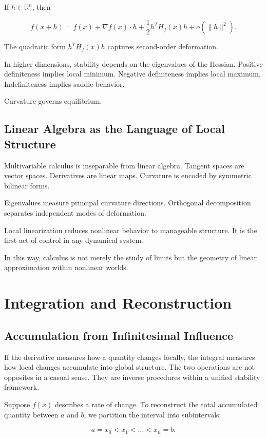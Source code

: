 \documentclass[12pt]{book}
\begin{document}
If $h \in \mathbb{R}^n$, then

\[
f(x + h) = f(x) + \nabla f(x) \cdot h + \frac{1}{2} h^T H_f(x) h + o(\|h\|^2).
\]

The quadratic form $h^T H_f(x) h$ captures second-order deformation.

In higher dimensions, stability depends on the eigenvalues of the Hessian. Positive definiteness implies local minimum. Negative definiteness implies local maximum. Indefiniteness implies saddle behavior.

Curvature governs equilibrium.

\section{Linear Algebra as the Language of Local Structure}

Multivariable calculus is inseparable from linear algebra. Tangent spaces are vector spaces. Derivatives are linear maps. Curvature is encoded by symmetric bilinear forms.

Eigenvalues measure principal curvature directions. Orthogonal decomposition separates independent modes of deformation.

Local linearization reduces nonlinear behavior to manageable structure. It is the first act of control in any dynamical system.

In this way, calculus is not merely the study of limits but the geometry of linear approximation within nonlinear worlds.

\chapter{Integration and Reconstruction}

\section{Accumulation from Infinitesimal Influence}

If the derivative measures how a quantity changes locally, the integral measures how local changes accumulate into global structure. The two operations are not opposites in a casual sense. They are inverse procedures within a unified stability framework.

Suppose $f(x)$ describes a rate of change. To reconstruct the total accumulated quantity between $a$ and $b$, we partition the interval into subintervals:

\[
a = x_0 < x_1 < \dots < x_n = b.
\]
\end{document}
